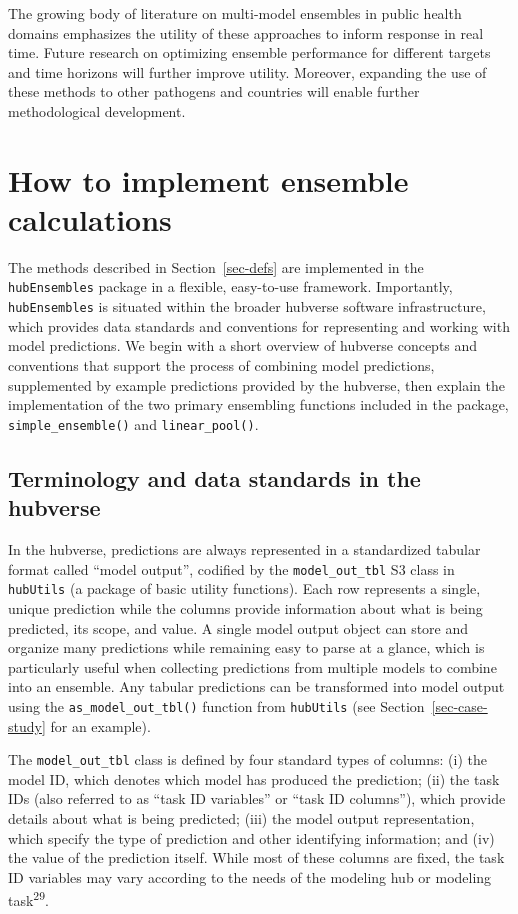 \documentclass[
  letterpaper,
  DIV=11,
  numbers=noendperiod]{scrartcl}
\begin{document}
The growing body of literature on multi-model ensembles in public health
domains emphasizes the utility of these approaches to inform response in
real time. Future research on optimizing ensemble performance for
different targets and time horizons will further improve utility.
Moreover, expanding the use of these methods to other pathogens and
countries will enable further methodological development.

\section{How to implement ensemble
calculations}\label{sec-implementation}

The methods described in Section~\ref{sec-defs} are implemented in the
\texttt{hubEnsembles} package in a flexible, easy-to-use framework.
Importantly, \texttt{hubEnsembles} is situated within the broader
hubverse software infrastructure, which provides data standards and
conventions for representing and working with model predictions. We
begin with a short overview of hubverse concepts and conventions that
support the process of combining model predictions, supplemented by
example predictions provided by the hubverse, then explain the
implementation of the two primary ensembling functions included in the
package, \texttt{simple\_ensemble()} and \texttt{linear\_pool()}.

\subsection{Terminology and data standards in the
hubverse}\label{terminology-and-data-standards-in-the-hubverse}

In the hubverse, predictions are always represented in a standardized
tabular format called ``model output'', codified by the
\texttt{model\_out\_tbl} S3 class in \texttt{hubUtils} (a package of
basic utility functions). Each row represents a single, unique
prediction while the columns provide information about what is being
predicted, its scope, and value. A single model output object can store
and organize many predictions while remaining easy to parse at a glance,
which is particularly useful when collecting predictions from multiple
models to combine into an ensemble. Any tabular predictions can be
transformed into model output using the \texttt{as\_model\_out\_tbl()}
function from \texttt{hubUtils} (see Section~\ref{sec-case-study} for an
example).

The \texttt{model\_out\_tbl} class is defined by four standard types of
columns: (i) the model ID, which denotes which model has produced the
prediction; (ii) the task IDs (also referred to as ``task ID variables''
or ``task ID columns''), which provide details about what is being
predicted; (iii) the model output representation, which specify the type
of prediction and other identifying information; and (iv) the value of
the prediction itself. While most of these columns are fixed, the task
ID variables may vary according to the needs of the modeling hub or
modeling task\textsuperscript{29}.
\end{document}
